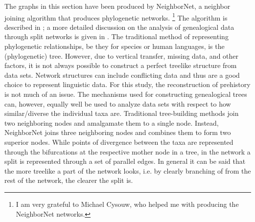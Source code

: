 The graphs in this section have been produced by NeighborNet, a neighbor joining algorithm that produces phylogenetic networks.
\footnote{I am very grateful to Michael Cysouw, who helped me with producing the NeighborNet networks.} 
The algorithm is described in \citet{NeighborNet}; a more detailed discussion on the analysis of genealogical data through split networks is given in \citet{NeighborNetApplication}.  
The traditional method of representing phylogenetic relationships, be they for species or human languages, is the (phylogenetic) tree.
However, due to vertical transfer, missing data, and other factors, it is not always possible to construct a perfect treelike structure from data sets.
Network structures can include conflicting data and thus are a good choice to represent linguistic data.
For this study, the reconstruction of prehistory is not much of an issue.
The mechanisms used for constructing genealogical trees can, however, equally well be used to analyze data sets with respect to how similar/diverse the individual taxa are.  
Traditional tree-building methods join two neighboring nodes and amalgamate them to a single node.
Instead, NeighborNet joins three neighboring nodes and combines them to form two superior nodes.
While points of divergence between the taxa are represented through the bifurcations at the respective mother node in a tree, in the network a split is represented through a set of parallel edges. 
In general it can be said that the more treelike a part of the network looks, i.e. by clearly branching of from the rest of the network, the clearer the split is.  


